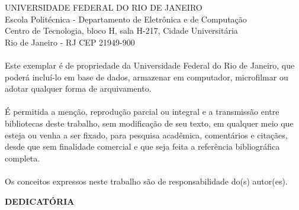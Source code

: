       \vspace{0.5cm}
      \begin{flushright}
         \parbox{10cm}{
            \hrulefill

            \vspace{-.375cm}

            \vspace{0.1cm}
         }
      \end{flushright}

\pagebreak

      \vspace{0.5cm}

UNIVERSIDADE FEDERAL DO RIO DE JANEIRO \\
Escola Polit\'ecnica - Departamento de Eletr\^onica e de Computa\c{c}\~ao \\
Centro de Tecnologia, bloco H, sala H-217, Cidade Universit\'aria \\
Rio de Janeiro - RJ      CEP 21949-900\\
\vspace{0.5cm}
\paragraph{}Este exemplar \'e de propriedade da Universidade Federal do Rio de Janeiro, que poder\'a inclu\'i-lo em base de dados, armazenar em computador, microfilmar ou adotar qualquer forma de arquivamento.
\paragraph{}\'E permitida a men\c{c}\~ao, reprodu\c{c}\~ao parcial ou integral e a transmiss\~ao entre bibliotecas deste trabalho, sem modifica\c{c}\~ao de seu texto, em qualquer meio que esteja ou venha a ser fixado, para pesquisa acad\^emica, coment\'arios e cita\c{c}\~aes, desde que sem finalidade comercial e que seja feita a refer\^encia bibliogr\'afica completa.
\paragraph{}Os conceitos expressos neste trabalho s\~ao de responsabilidade do(s) autor(es).


\pagebreak

\begin{center}
\textbf{DEDICAT\'ORIA}
\end{center}
      \vspace{0.5cm}

